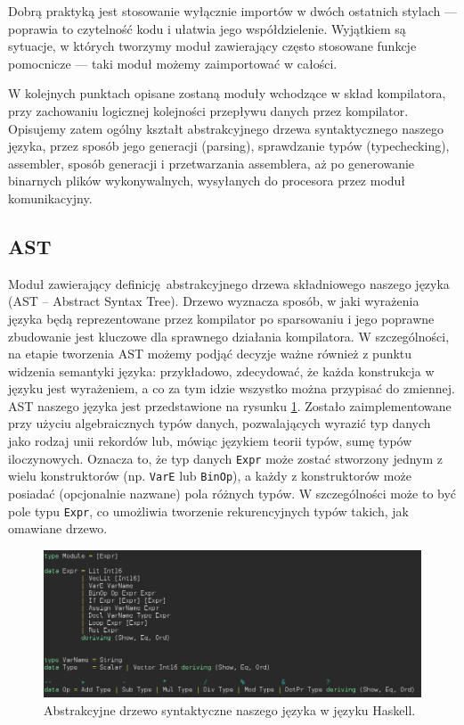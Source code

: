 Dobrą praktyką jest stosowanie wyłącznie importów w dwóch ostatnich stylach --- poprawia to czytelność kodu i ułatwia jego współdzielenie. Wyjątkiem są sytuacje, w których tworzymy moduł zawierający często stosowane funkcje pomocnicze --- taki moduł możemy zaimportować w całości.

W kolejnych punktach opisane zostaną moduły wchodzące w skład kompilatora, przy zachowaniu logicznej kolejności przepływu danych przez kompilator. Opisujemy zatem ogólny kształt  abstrakcyjnego drzewa syntaktycznego naszego języka, przez sposób jego generacji (parsing), sprawdzanie typów (typechecking), assembler, sposób generacji i przetwarzania assemblera, aż po generowanie binarnych plików wykonywalnych, wysyłanych do procesora przez moduł komunikacyjny.

\subsection{AST}

Moduł zawierający definicję abstrakcyjnego drzewa składniowego naszego języka (AST -- Abstract Syntax Tree). Drzewo wyznacza sposób, w jaki wyrażenia języka będą reprezentowane przez kompilator po sparsowaniu i jego poprawne zbudowanie jest kluczowe dla sprawnego działania kompilatora. W szczególności, na etapie tworzenia AST możemy podjąć decyzje ważne również z punktu widzenia semantyki języka: przykładowo, zdecydować, że każda konstrukcja w języku jest wyrażeniem, a co za tym idzie wszystko można przypisać do zmiennej. AST naszego języka jest przedstawione na rysunku \ref{fig:ast}. Zostało zaimplementowane przy użyciu algebraicznych typów danych, pozwalających wyrazić typ danych jako rodzaj unii rekordów lub, mówiąc językiem teorii typów, sumę typów iloczynowych. Oznacza to, że typ danych \texttt{Expr} może zostać stworzony jednym z wielu konstruktorów (np. \texttt{VarE} lub \texttt{BinOp}), a każdy z konstruktorów może posiadać (opcjonalnie nazwane) pola różnych typów. W szczególności może to być pole typu \texttt{Expr}, co umożliwia tworzenie rekurencyjnych typów takich, jak omawiane drzewo.

\begin{figure}
  \begin{center}
    \includegraphics[scale=0.5]{images/AST.png}
    \caption{Abstrakcyjne drzewo syntaktyczne naszego języka w języku Haskell.}
    \label{fig:ast}
  \end{center}
\end{figure}

